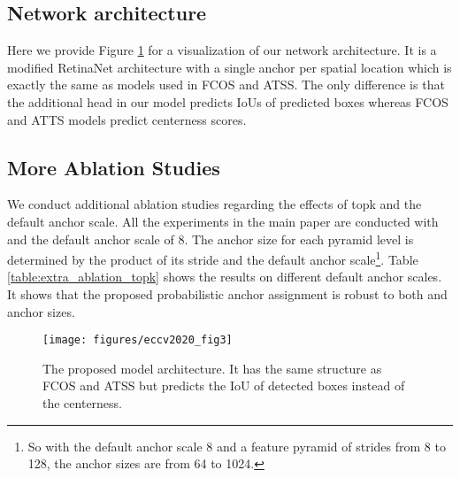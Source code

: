 \documentclass[runningheads]{llncs}
\begin{document}
\subsection{Network architecture}
Here we provide Figure \ref{fig3} for a visualization of our network architecture. It is a modified RetinaNet architecture with a single anchor per spatial location which is exactly the same as models used in FCOS\cite{fcos} and ATSS\cite{atss}. The only difference is that the additional head in our model predicts IoUs of predicted boxes whereas FCOS and ATTS models predict centerness scores.

\subsection{More Ablation Studies}
We conduct additional ablation studies regarding the effects of topk  and the default anchor scale. All the experiments in the main paper are conducted with  and the default anchor scale of 8. The anchor size for each pyramid level is determined by the product of its stride and the default anchor scale\footnote{So with the default anchor scale 8 and a feature pyramid of strides from 8 to 128, the anchor sizes are from 64 to 1024.}. Table \ref{table:extra_ablation_topk} shows the results on different default anchor scales. It shows that the proposed probabilistic anchor assignment is robust to both  and anchor sizes. 
\begin{figure}[t]
	\begin{center}
		\texttt{[image: figures/eccv2020\_fig3]}
	\end{center}
	\caption{The proposed model architecture. It has the same structure as FCOS\cite{fcos} and ATSS\cite{atss} but predicts the IoU of detected boxes instead of the centerness.}
	\label{fig3}
\end{figure}
\end{document}
